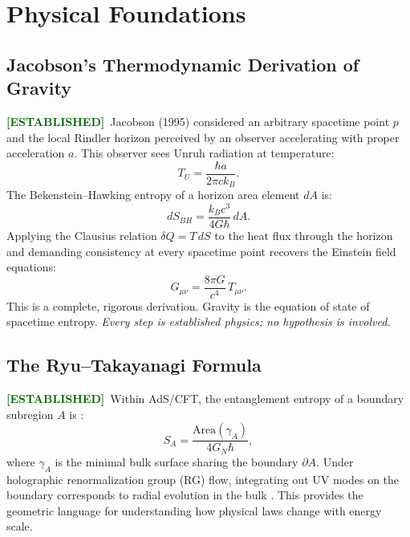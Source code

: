 \documentclass[12pt,a4paper]{article}
\newcommand{\EST}{\textcolor{darkgreen}{\textbf{[ESTABLISHED]}}}
\theoremstyle{monette}
\theoremstyle{definition}
\newcommand{\SA}{S_A}
\begin{document}
\section{Physical Foundations}
\label{sec:foundations}

\subsection{Jacobson's Thermodynamic Derivation of Gravity}
\label{sec:jacobson}

\EST\ Jacobson (1995) considered an arbitrary spacetime point $p$ and
the local Rindler horizon perceived by an observer accelerating with proper
acceleration $a$. This observer sees Unruh radiation at temperature:
\begin{equation}
  T_U = \frac{\hbar a}{2\pi c k_B}.
  \label{eq:unruh}
\end{equation}
The Bekenstein--Hawking entropy of a horizon area element $dA$ is:
\begin{equation}
  dS_{BH} = \frac{k_B c^3}{4 G\hbar}\,dA.
  \label{eq:BH}
\end{equation}
Applying the Clausius relation $\delta Q = T\,dS$ to the heat flux through
the horizon and demanding consistency at every spacetime point recovers
the Einstein field equations:
\begin{equation}
  G_{\mu\nu} = \frac{8\pi G}{c^4}\,T_{\mu\nu}.
  \label{eq:EFE_standard}
\end{equation}
This is a complete, rigorous derivation. Gravity is the equation of state of spacetime
entropy. \emph{Every step is established physics; no hypothesis is involved.}

\subsection{The Ryu--Takayanagi Formula}
\label{sec:RT}

\EST\ Within AdS/CFT, the entanglement entropy of a boundary subregion $A$ is
\cite{RyuTakayanagi2006}:
\begin{equation}
  \SA = \frac{\mathrm{Area}(\gamma_A)}{4G_N\hbar},
  \label{eq:RT}
\end{equation}
where $\gamma_A$ is the minimal bulk surface sharing the boundary $\partial A$.
Under holographic renormalization group (RG) flow, integrating out UV modes on the
boundary corresponds to radial evolution in the bulk \cite{deBoer2000, Heemskerk2011}.
This provides the geometric language for understanding how physical laws change with
energy scale.
\end{document}
